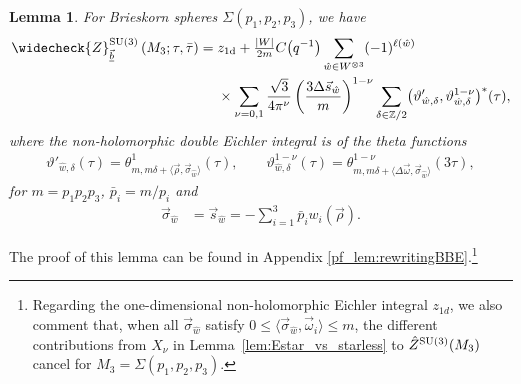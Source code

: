 \documentclass[pdftex]{sigma}
\def\BZ{\mathbb{Z}}
\newcommand{\Zchlong}[3]{\ensuremath{\widecheck{Z}^{#1}_{#2}\left(#3;\tau,\bar{\tau}\right)}}
\def\bv{{\vec{\underline{b}}}}
\newtheorem{lem}[thm]{Lemma}
\theoremstyle{definition}
\numberwithin{equation}{section}
\begin{document}
\begin{lem}\label{lem:brieskorn_thetas}
 For Brieskorn spheres $\Sigma(p_1,p_2,p_3)$, we have
\begin{align*}%
\Zchlong{{\rm SU}(3)}{\bv}{M_3}
 ={}&z_{1\rm d}+ \tfrac{|W|}{2m}C\bigl(q^{-1}\bigr) \sum\limits_{\hat{w}\in W^{\otimes 3}}(-1)^{\ell(\hat{w})} \\
 &\times\sum_{\nu=0,1} \frac{\sqrt{3}}{4 \pi^{\nu}}	\left(\frac {3\Delta\vec{s}_{\hat w}}{m}\right)^{1-\nu}\sum_{\delta\in\BZ/2} \bigl(\vartheta'_{\hat w,\delta},\vartheta^{1-\nu}_{\hat w,\delta}\bigr)^\ast(\tau)
,
\end{align*}
where the non-holomorphic double Eichler integral is of the theta functions
\begin{gather*}
 \vartheta'_{\hat w,\delta}(\tau)=
 \theta^1_{m, m\delta+\langle \vec\rho, \vec\sigma_{\hat w}\rangle}(\tau),\qquad
 \vartheta^{1-\nu}_{\hat w,\delta}(\tau) = \theta^{1-\nu}_{m,m\delta + \langle \Delta\vec\omega, \vec{\sigma}_{\hat w}\rangle}(3\tau),
 \end{gather*}
for $m=p_1p_2p_3$, $\bar p_i = m/p_i$ and
\begin{align*}
\vec\sigma_{\hat w} &= \vec{s}_{\hat{w}} = -\sum\limits_{i=1}^3 \bar{p}_i w_i(\vec{\rho}) .
\end{align*}
\end{lem}
The proof of this lemma can be found in Appendix \ref{pf_lem:rewritingBBE}.\footnote{Regarding the one-dimensional non-holomorphic Eichler integral $z_{1d}$,
we also comment that, when all $\vec\sigma_{\hat w}$ satisfy $0\leq \langle \vec\sigma_{\hat w}, \vec \omega_i\rangle \leq m$, the different contributions from $X_\nu$
in Lemma~\ref{lem:Estar_vs_starless}
to $\hat Z^{{\rm SU}(3)}(M_3)$ cancel for $M_3=\Sigma(p_1,p_2,p_3)$.}
\end{document}
